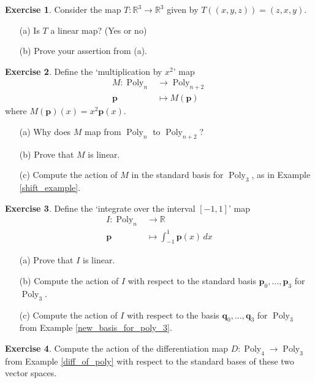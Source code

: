 \documentclass[a4paper,11pt]{book}
\theoremstyle{definition}
\newtheorem{exercise}{Exercise}
\newcommand{\ve}[1]{\mathbf{#1}}
\DeclareMathOperator{\Poly}{Poly}
\begin{document}
\begin{exercise} Consider the map $T : \mathbb{R}^3 \rightarrow \mathbb{R}^3$ given by $T\left( (x,y,z) \right) = (z,x,y)$.
\begin{itemize}
 \item[(a)] Is $T$ a linear map? (Yes or no)
 \item[(b)] Prove your assertion from (a).
\end{itemize}
\end{exercise}

\begin{exercise} Define the `multiplication by $x^2$' map
\begin{align*}
 M : \Poly_n & \rightarrow \Poly_{n+2} \\
 \ve{p} & \mapsto M(\ve{p})
\end{align*}
where $M(\ve{p})(x) = x^2 \ve{p}(x)$. 
\begin{itemize}
 \item[(a)] Why does $M$ map from $\Poly_n$ to $\Poly_{n+2}$? 
 \item[(b)] Prove that $M$ is linear.
 \item[(c)] Compute the action of $M$ in the standard basis for $\Poly_3$, as in Example \ref{shift_example}.
\end{itemize}
\end{exercise}

\begin{exercise} Define the `integrate over the interval $[-1,1]$' map
\begin{align*}
 I : \Poly_n & \rightarrow \mathbb{R}  \\
 \ve{p} & \mapsto \int_{-1}^{1} \ve{p}(x) \, dx
\end{align*}
\begin{itemize}
 \item[(a)] Prove that $I$ is linear.
 \item[(b)] Compute the action of $I$ with respect to the standard basis $\ve{p}_0, \ldots, \ve{p}_3$ for $\Poly_3$.
  \item[(c)] Compute the action of $I$ with respect to the basis $\ve{q}_0, \ldots, \ve{q}_3$ for $\Poly_3$ from Example \ref{new_basis_for_poly_3}.
\end{itemize}
\end{exercise}

\begin{exercise} Compute the action of the differentiation map $D : \Poly_4 \rightarrow \Poly_3$ from Example \ref{diff_of_poly} with respect to the standard bases of these two vector spaces.
\end{exercise}
\end{document}
